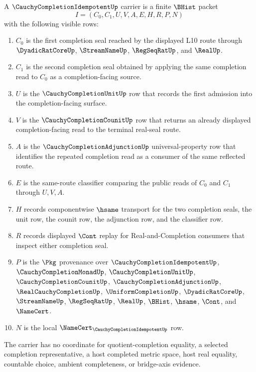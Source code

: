 \begin{definition}
\label{def:cauchy-completion-idempotent-carrier}
A $\CauchyCompletionIdempotentUp$ carrier is a finite $\BHist$ packet
$$
I=(C_0,C_1,U,V,A,E,H,R,P,N)
$$
with the following visible rows:
\begin{enumerate}
\item $C_0$ is the first completion seal reached by the displayed L10 route through $\DyadicRatCoreUp$, $\StreamNameUp$, $\RegSeqRatUp$, and $\RealUp$.
\item $C_1$ is the second completion seal obtained by applying the same completion read to $C_0$ as a completion-facing source.
\item $U$ is the $\CauchyCompletionUnitUp$ row that records the first admission into the completion-facing surface.
\item $V$ is the $\CauchyCompletionCounitUp$ row that returns an already displayed completion-facing read to the terminal real-seal route.
\item $A$ is the $\CauchyCompletionAdjunctionUp$ universal-property row that identifies the repeated completion read as a consumer of the same reflected route.
\item $E$ is the same-route classifier comparing the public reads of $C_0$ and $C_1$ through $U,V,A$.
\item $H$ records componentwise $\hsame$ transport for the two completion seals, the unit row, the counit row, the adjunction row, and the classifier row.
\item $R$ records displayed $\Cont$ replay for Real-and-Completion consumers that inspect either completion seal.
\item $P$ is the $\Pkg$ provenance over $\CauchyCompletionIdempotentUp$, $\CauchyCompletionMonadUp$, $\CauchyCompletionUnitUp$, $\CauchyCompletionCounitUp$, $\CauchyCompletionAdjunctionUp$, $\RealCauchyCompletionUp$, $\UniformCompletionUp$, $\DyadicRatCoreUp$, $\StreamNameUp$, $\RegSeqRatUp$, $\RealUp$, $\BHist$, $\hsame$, $\Cont$, and $\NameCert$.
\item $N$ is the local $\NameCert_{\CauchyCompletionIdempotentUp}$ row.
\end{enumerate}
The carrier has no coordinate for quotient-completion equality, a selected completion representative, a host completed metric space, host real equality, countable choice, ambient completeness, or bridge-axis evidence.
\end{definition}

